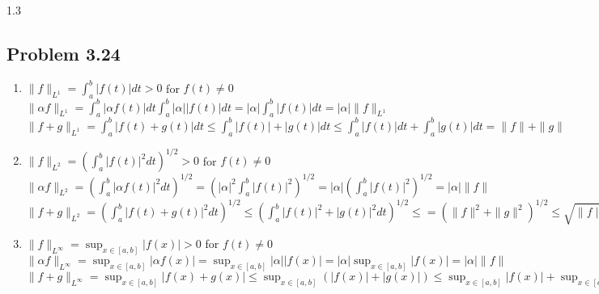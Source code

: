 \documentclass[letterpaper,12pt]{article}
\theoremstyle{definition}
\begin{document}
\begin{spacing}{1.3}{}
\subsection*{Problem 3.24}
	\begin{enumerate}
	\item
	$\|f\|_{L^{1}} = \int_{a}^{b} |f(t)|dt >0$ for $f(t) \neq 0$ \\

	$\|\alpha f\|_{L^{1}} = \int_{a}^{b} |\alpha f(t)|dt \int_{a}^{b} |\alpha| |f(t)|dt = |\alpha| \int_{a}^{b} |f(t)|dt = |\alpha| \|f\|_{L^{1}}$ \\

	$\|f+g\|_{L^{1}} = \int_{a}^{b} |f(t)+g(t)|dt \leq \int_{a}^{b} |f(t)|+|g(t)|dt \leq \int_{a}^{b}|f(t)|dt + \int_{a}^{b}|g(t)|dt = \|f\| + \|g\| $ \\
	\item


	$\|f\|_{L^{2}} = (\int_{a}^{b} |f(t)|^{2}dt)^{1/2} >0$ for $f(t) \neq 0$ \\

	$\|\alpha f\|_{L^{2}} = (\int_{a}^{b} |\alpha f(t)|^{2}dt)^{1/2} = ( |\alpha|^2 \int_{a}^{b} |f(t)|^{2})^{1/2} = |\alpha|(\int_{a}^{b} |f(t)|^{2})^{1/2} = |\alpha| \|f\| $\\

	$\|f+g\|_{L^{2}} = (\int_{a}^{b} |f(t)+g(t)|^2 dt)^{1/2} \leq (\int_{a}^{b} |f(t)|^2+|g(t)|^2 dt)^{1/2} \leq = (\|f\|^2 + \|g\|^2)^{1/2} \leq \sqrt{\|f\|^2} + \sqrt{\|g\|^2} = \|f\|+\|g\|  $ \\
	\item

	$\|f\|_{L^{\infty}} = \sup_{x \in [a,b]} |f(x)| >0$ for $f(t) \neq 0$ \\

	$\|\alpha f\|_{L^{\infty}} = \sup_{x \in [a,b]} |\alpha f(x)| = \sup_{x \in [a,b]} |\alpha| |f(x)| = |\alpha| \sup_{x \in [a,b]} |f(x)| = |\alpha| \|f\|$\\

	$\|f+g\|_{L^{\infty}} = \sup_{x \in [a,b]} |f(x)+g(x)| \leq \sup_{x \in [a,b]} (|f(x)|+|g(x)|) \leq \sup_{x \in [a,b]} |f(x)| + \sup_{x \in [a,b]} |g(x)| = \|f\| + \|g\| $ \

	\end{enumerate}


\end{spacing}
\end{document}
